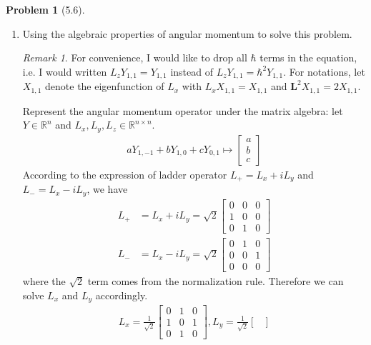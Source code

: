 \documentclass[twoside,11pt]{article}
\newcommand{\RR}{\mathbb{R}}
\theoremstyle{definition}
\newtheorem{problem}{Problem}
\theoremstyle{remark}
\newtheorem*{remark}{Remark}
\begin{document}
\begin{problem}[5.6]
\begin{enumerate}[label=(\alph*)]
        \item Using the algebraic properties of angular momentum to solve this problem.
        \begin{remark}
            For convenience, I would like to drop all $\hbar$ terms in the equation, i.e.
            I would written $L_z Y_{1,1} = Y_{1,1}$ instead of $L_z Y_{1,1}=\hbar^2 Y_{1,1}$.
            For notations, let $X_{1,1}$ denote the eigenfunction of $L_x$ with
            $L_x X_{1,1} = X_{1,1}$ and $\mathbf{L}^2 X_{1,1} = 2 X_{1,1}$.
        \end{remark}
        Represent the angular momentum operator under the matrix algebra: 
        let $Y\in\RR^n$ and $L_x, L_y, L_z\in\RR^{n\times n}$.
        \begin{align*}
            aY_{1,-1} + bY_{1,0} + cY_{0,1}\mapsto \begin{bmatrix}
                a\\ b\\ c
            \end{bmatrix}
        \end{align*}
        According to the expression of ladder operator $L_+=L_x+iL_y$ and 
        $L_-=L_x-iL_y$, we have
        \begin{align*}
            L_+ &= L_x + i L_y = \sqrt{2}\begin{bmatrix}
                0 & 0 & 0 \\
                1 & 0 & 0 \\
                0 & 1 & 0
            \end{bmatrix}\\
            L_- &= L_x - i L_y = \sqrt{2}\begin{bmatrix}
                0 & 1 & 0 \\
                0 & 0 & 1 \\
                0 & 0 & 0
            \end{bmatrix}
        \end{align*}
        where the $\sqrt{2}$ term comes from the normalization rule.
        Therefore we can solve $L_x$ and $L_y$ accordingly.
        \begin{align*}
            L_x = \frac{1}{\sqrt{2}}\begin{bmatrix}
                0 & 1 & 0\\
                1 & 0 & 1\\
                0 & 1 & 0
            \end{bmatrix}, 
            L_y = \frac{1}{\sqrt{2}}\begin{bmatrix}

\end{bmatrix}
\end{align*}
\end{enumerate}
\end{problem}
\end{document}
